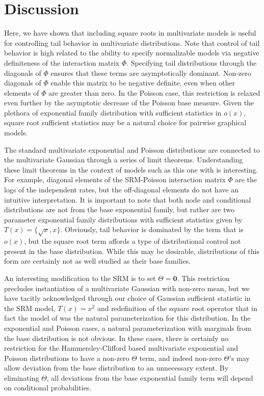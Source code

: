 \documentclass{samkoelleprelimworking}
\begin{document}
 \section{Discussion}
 
Here, we have shown that including square roots in multivariate models is useful for controlling tail behavior in multivariate distributions.  Note that control of tail behavior is high related to the ability to specify normalizable models via negative definiteness of the interaction matrix $\Phi$.    Specifying tail distributions through the diagonals of $\Phi$ ensures that these terms are asymptotically dominant.  Non-zero diagonals of $\Phi$ enable this matrix to be negative definite, even when other elements of $\Phi$ are greater than zero.  In the Poisson case, this restriction is relaxed even further by the asymptotic decrease of the Poisson base measure.  Given the plethora of exponential family distribution with sufficient statistics in $o(x)$, square root sufficient statistics may be a natural choice for pairwise graphical models.  

The standard multivariate exponential and Poisson distributions are connected to the multivariate Gaussian through a series of limit theorems.  Understanding these limit theorems in the context of models such as this one with is interesting.  For example, diagonal elements of the SRM-Poisson interaction matrix $\Phi$ are the logs of the independent rates, but the off-diagonal elements do not have an intuitive interpretation.  
It is important to note that both node and conditional distributions are not from the base exponential family, but rather are two parameter exponential family distributions with sufficient statistics given by $T(x) = \{ \sqrt{x}, x \}$.  Obviously, tail behavior is dominated by the term that is $o(x)$, but the square root term affords a type of distributional control not present in the base distribution.  While this may be desirable, distributions of this form are certainly not as well studied as their base families.

An interesting modification to the SRM is to set $\Theta = \bm{0}$.  This restriction precludes instantiation of a multivariate Gaussian with non-zero mean, but we have tacitly acknowledged through our choice of Gaussian sufficient statistic in the SRM model, $T(x) = x^2$ and redefinition of the square root operator that in fact the model of \citep{Yang} was the natural parameterization for this distribution.  In the exponential and Poisson cases, a natural parameterization with marginals from the base distribution is not obvious.   In these cases, there is certainly no restriction for the Hammersley-Clifford based multivariate exponential and Poisson distributions to have a non-zero $\Theta$ term, and indeed non-zero $\Theta$'s may allow deviation from the base distribution to an unnecessary extent.  By eliminating $\Theta$, all deviations from the base exponential family term will depend on conditional probabilities.
\end{document}
